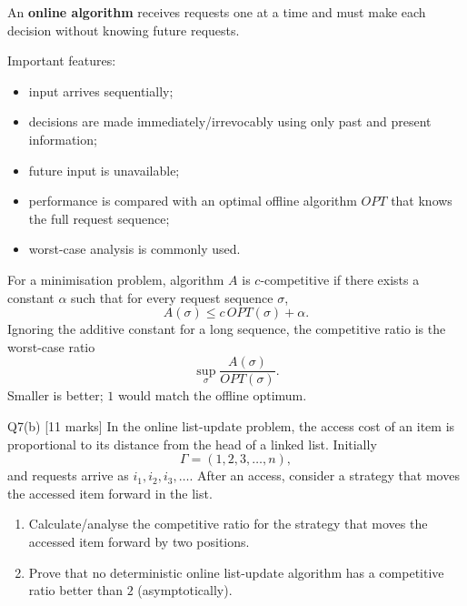 \documentclass[10.5pt,a4paper]{article}
\begin{document}
\begin{answerbox}
An \textbf{online algorithm} receives requests one at a time and must make each decision without knowing future requests.

Important features:
\begin{itemize}
\item input arrives sequentially;
\item decisions are made immediately/irrevocably using only past and present information;
\item future input is unavailable;
\item performance is compared with an optimal offline algorithm $OPT$ that knows the full request sequence;
\item worst-case analysis is commonly used.
\end{itemize}

For a minimisation problem, algorithm $A$ is $c$-competitive if there exists a constant $\alpha$ such that for every request sequence $\sigma$,
\[
\boxed{A(\sigma)\le c\,OPT(\sigma)+\alpha.}
\]
Ignoring the additive constant for a long sequence, the competitive ratio is the worst-case ratio
\[
\boxed{\sup_{\sigma}\frac{A(\sigma)}{OPT(\sigma)}.}
\]
Smaller is better; $1$ would match the offline optimum.
\end{answerbox}

\begin{questionbox}{Q7(b) [11 marks]}
In the online list-update problem, the access cost of an item is proportional to its distance from the head of a linked list. Initially
\[
\Gamma=(1,2,3,\ldots,n),
\]
and requests arrive as $i_1,i_2,i_3,\ldots$. After an access, consider a strategy that moves the accessed item forward in the list.

\begin{enumerate}[label=(\roman*)]
\item Calculate/analyse the competitive ratio for the strategy that moves the accessed item forward by two positions.
\item Prove that no deterministic online list-update algorithm has a competitive ratio better than $2$ (asymptotically).
\end{enumerate}
\end{questionbox}
\end{document}
